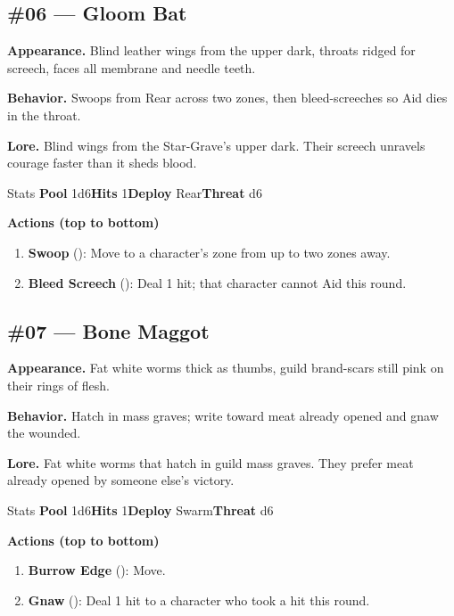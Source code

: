 \subsection*{\#06 --- Gloom Bat}

\textbf{Appearance.} Blind leather wings from the upper dark, throats ridged for screech, faces all membrane and needle teeth.

\textbf{Behavior.} Swoops from Rear across two zones, then bleed-screeches so Aid dies in the throat.

\textbf{Lore.} Blind wings from the Star-Grave's upper dark. Their screech unravels courage faster than it sheds blood.

\begin{monsterentry}{Stats}
\textbf{Pool} 1d6\quad\textbf{Hits} 1\quad\textbf{Deploy} Rear\quad\textbf{Threat} d6

\textbf{Actions (top to bottom)}
\begin{enumerate}\setlength{\itemsep}{0.15em}\setlength{\parskip}{0pt}
  \item \textbf{Swoop} (\easy): Move to a character's zone from up to two zones away.
  \item \textbf{Bleed Screech} (\medium): Deal 1 hit; that character cannot Aid this round.
\end{enumerate}
\end{monsterentry}

\subsection*{\#07 --- Bone Maggot}

\textbf{Appearance.} Fat white worms thick as thumbs, guild brand-scars still pink on their rings of flesh.

\textbf{Behavior.} Hatch in mass graves; write toward meat already opened and gnaw the wounded.

\textbf{Lore.} Fat white worms that hatch in guild mass graves. They prefer meat already opened by someone else's victory.

\begin{monsterentry}{Stats}
\textbf{Pool} 1d6\quad\textbf{Hits} 1\quad\textbf{Deploy} Swarm\quad\textbf{Threat} d6

\textbf{Actions (top to bottom)}
\begin{enumerate}\setlength{\itemsep}{0.15em}\setlength{\parskip}{0pt}
  \item \textbf{Burrow Edge} (\easy): Move.
  \item \textbf{Gnaw} (\easy): Deal 1 hit to a character who took a hit this round.
\end{enumerate}
\end{monsterentry}

